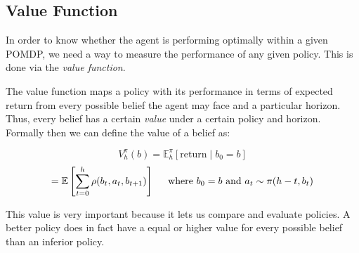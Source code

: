 %
%
%

\subsection{Value Function}

In order to know whether the agent is performing optimally within a given POMDP, we need a way to measure
the performance of any given policy. This is done via the \textit{value function}.

The value function maps a policy with its performance in terms of expected return from every
possible belief the agent may face and a particular horizon. Thus, every belief has a certain
\textit{value} under a certain policy and horizon. Formally then we can define the value of a belief
as:

\[ V^\pi_{h}(b) = \mathbb{E}^\pi_h \left [\text{return} \mid b_0 = b \right ] \]
\[ = \mathbb{E} \left [\sum_{t=0}^{h} \rho(b_{t}, a_t, b_{t+1}) \right ]
    \hspace{0.5cm}\text{where }b_0 = b \text{ and }a_t \sim \pi(h-t, b_t) \]

This value is very important because it lets us compare and evaluate policies. A better policy does
in fact have a equal or higher value for every possible belief than an inferior policy. 

